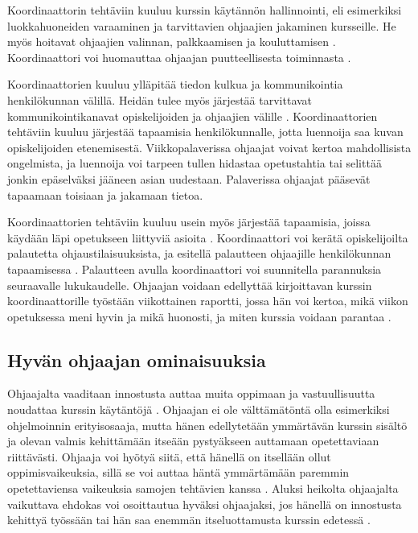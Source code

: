 \documentclass[finnish]{tktltiki2}
\theoremstyle{definition}
\theoremstyle{remark}
\begin{document}
Koordinaattorin tehtäviin kuuluu kurssin käytännön hallinnointi, eli esimerkiksi luokkahuoneiden varaaminen ja tarvittavien ohjaajien jakaminen kursseille. He myös hoitavat ohjaajien valinnan, palkkaamisen ja kouluttamisen \cite{Reges88,Roberts95}. Koordinaattori voi huomauttaa ohjaajan puutteellisesta toiminnasta \cite{Reges88}. \par

Koordinaattorien kuuluu ylläpitää tiedon kulkua ja kommunikointia henkilökunnan välillä. Heidän tulee myös järjestää tarvittavat kommunikointikanavat opiskelijoiden ja ohjaajien välille \cite{Reges88}. Koordinaattorien tehtäviin kuuluu järjestää tapaamisia henkilökunnalle, jotta luennoija saa kuvan opiskelijoiden etenemisestä. Viikkopalaverissa ohjaajat voivat kertoa mahdollisista ongelmista, ja luennoija voi tarpeen tullen hidastaa opetustahtia tai selittää jonkin epäselväksi jääneen asian uudestaan. Palaverissa ohjaajat pääsevät tapaamaan toisiaan ja jakamaan tietoa. \par

Koordinaattorien tehtäviin kuuluu usein myös järjestää tapaamisia, joissa käydään läpi opetukseen liittyviä asioita \cite{Reges88, Roberts95}. Koordinaattori voi kerätä opiskelijoilta palautetta ohjaustilaisuuksista, ja esitellä palautteen ohjaajille henkilökunnan tapaamisessa \cite{Patitsas12_2}. Palautteen avulla koordinaattori voi suunnitella parannuksia seuraavalle lukukaudelle. Ohjaajan voidaan edellyttää kirjoittavan kurssin koordinaattorille työstään viikottainen raportti, jossa hän voi kertoa, mikä viikon opetuksessa meni hyvin ja mikä huonosti, ja miten kurssia voidaan parantaa \cite{Hug11}. \par


\subsection{Hyvän ohjaajan ominaisuuksia}
Ohjaajalta vaaditaan innostusta auttaa muita oppimaan ja vastuullisuutta noudattaa kurssin käytäntöjä \cite{Reges88}. Ohjaajan ei ole välttämätöntä olla esimerkiksi ohjelmoinnin erityisosaaja, mutta hänen edellytetään ymmärtävän kurssin sisältö ja olevan valmis kehittämään itseään pystyäkseen auttamaan opetettaviaan riittävästi. Ohjaaja voi hyötyä siitä, että hänellä on itsellään ollut oppimisvaikeuksia, sillä se voi auttaa häntä ymmärtämään paremmin opetettaviensa vaikeuksia samojen tehtävien kanssa \cite{Decker06}.  Aluksi heikolta ohjaajalta vaikuttava ehdokas voi osoittautua hyväksi ohjaajaksi, jos hänellä on innostusta kehittyä työssään tai hän saa enemmän itseluottamusta kurssin edetessä \cite{Dickson11}. \par
\end{document}
